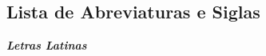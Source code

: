 \clearpage
{}
{}
\renewcommand{\listfigurename}
{\begin{center} {\chapter*{Lista de Abreviaturas e Siglas}} \end{center}}
\printnomenclature

\begin{center}
\chapter*{Lista de Abreviaturas e Siglas}
\end{center}

\noindent\textbf{\emph{Letras Latinas}}\\

